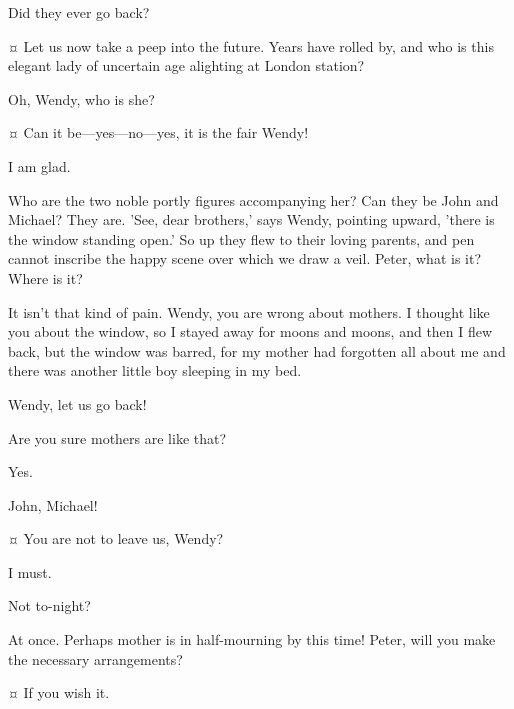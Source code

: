 \begin{drama}

\firsttwinspeaks
Did they ever go back?

\wendyspeaks {}¤
Let us now take a peep into the future.
Years have rolled by, and who is this elegant lady of uncertain age alighting at London station?


\nibsspeaks
Oh, Wendy, who is she?

\wendyspeaks {}¤
Can it be—yes—no—yes, it is the fair Wendy!

\tootlesspeaks
I am glad.

\wendyspeaks
Who are the two noble portly figures accompanying her?
Can they be John and Michael?
They are.
'See, dear brothers,' says Wendy, pointing upward, 'there is the window standing open.'
So up they flew to their loving parents, and pen cannot inscribe the happy scene over which we draw a veil.
Peter, what is it?
Where is it?

\peterspeaks
It isn't that kind of pain.
Wendy, you are wrong about mothers.
I thought like you about the window, so I stayed away for moons and moons,
and then I flew back, but the window was barred,
for my mother had forgotten all about me and there was another little boy sleeping in my bed.


\johnspeaks
Wendy, let us go back!

\wendyspeaks
Are you sure mothers are like that?

\peterspeaks
Yes.

\wendyspeaks
John, Michael!

\firsttwinspeaks {}¤
You are not to leave us, Wendy?

\wendyspeaks
I must.

\nibsspeaks
Not to-night?

\wendyspeaks
At once.
Perhaps mother is in half-mourning by this time!
Peter, will you make the necessary arrangements?


\peterspeaks {}¤
If you wish it.


\end{drama}
